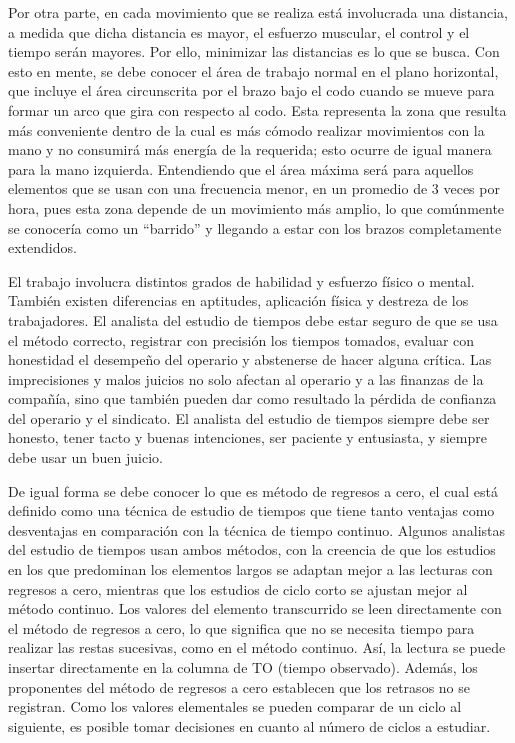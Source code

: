      Por otra parte, en cada movimiento que se realiza está involucrada una distancia, a medida que dicha distancia es mayor, el esfuerzo muscular, el control y el tiempo serán mayores. Por ello, minimizar las distancias es lo que se busca.
    Con esto en mente, se debe conocer el área de trabajo normal en el plano horizontal, que incluye el área circunscrita por el brazo bajo el codo cuando se mueve para formar un arco que gira con respecto al codo.
    Esta representa la zona que resulta más conveniente dentro de la cual es más cómodo realizar movimientos con la mano y no consumirá más energía de la requerida; esto ocurre de igual manera para la mano izquierda.
    Entendiendo que el área máxima será para aquellos elementos que se usan con una frecuencia menor, en un promedio de 3 veces por hora, pues esta zona depende de un movimiento más amplio, lo que comúnmente se conocería como un “barrido” y llegando a estar con los brazos completamente extendidos.
    
    
    
    El trabajo involucra distintos grados de habilidad y esfuerzo físico o mental. También existen diferencias en aptitudes, aplicación física y destreza de los trabajadores. El analista del estudio de tiempos debe estar seguro de que se usa el método correcto, registrar con precisión los tiempos tomados, evaluar con honestidad el desempeño del operario y abstenerse de hacer alguna crítica. Las imprecisiones y malos juicios no solo afectan al operario y a las finanzas de la compañía, sino que también pueden dar como resultado la pérdida de confianza del operario y el sindicato. El analista del estudio de tiempos siempre debe ser honesto, tener tacto y buenas intenciones, ser paciente y entusiasta, y siempre debe usar un buen juicio.
    
    
    
    De igual forma se debe conocer lo que es método de regresos a cero, el cual está definido como una técnica de estudio de tiempos que tiene tanto ventajas como desventajas en comparación con la técnica de tiempo continuo. Algunos analistas del estudio de tiempos usan ambos métodos, con la creencia de que los estudios en los que predominan los elementos largos se adaptan mejor a las lecturas con regresos a cero, mientras que los estudios de ciclo corto se ajustan mejor al método continuo. Los valores del elemento transcurrido se leen directamente con el método de regresos a cero, lo que significa que no se necesita tiempo para realizar las restas sucesivas, como en el método continuo. Así, la lectura se puede insertar directamente en la columna de TO (tiempo observado). Además, los proponentes del método de regresos a cero establecen que los retrasos no se registran. Como los valores elementales se pueden comparar de un ciclo al siguiente, es posible tomar decisiones en cuanto al número de ciclos a estudiar. \cite{niebel1980ingenieria}
    
